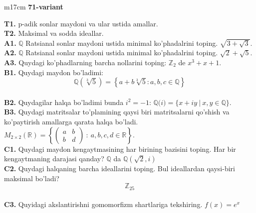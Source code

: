 \documentclass{article}
\begin{document}
\begin{tabular}{m{17cm}}
\textbf{71-variant}
\newline

\textbf{T1.} p-adik sonlar maydoni va ular ustida amallar. \\
\textbf{T2.} Maksimal va sodda ideallar. \\
\textbf{A1.} \(\mathbb{Q}\) Ratsianal sonlar maydoni ustida minimal ko'phadalrini toping.
\(\sqrt{3 + \sqrt{3}}\). \\
\textbf{A2.} \(\mathbb{Q}\) Ratsianal sonlar maydoni ustida minimal ko'phadalrini toping.
\(\sqrt{2} + \sqrt{5}\). \\
\textbf{A3.} Quydagi ko'phadlarning barcha nollarini toping:
\(\mathbb{Z}_{2}\) de \(x^{3} + x + 1\). \\
\textbf{B1.} Quydagi maydon bo'ladimi:
\[\mathbb{Q}\left( \sqrt[3]{5} \right) = \left\{ a + b\sqrt[3]{5}:a,b,c \in \mathbb{Q} \right\}\] \\
\textbf{B2.} Quydagilar halqa bo'ladimi bunda \(i^{2} = - 1\):
\(\mathbb{Q(}i) = \{ x + iy\ |\ x,y \in \mathbb{Q\}}\). \\
\textbf{B3.} Quydagi matritsalar to'plamining qaysi biri matritsalarni qo'shish va ko'paytirish amallarga qarata halqa bo'ladi.
\(M_{2 \times 2}\mathbb{(R) =}\left\{ \begin{pmatrix}
a & b \\
b & d
\end{pmatrix}\ :\ a,b,c,d \in \mathbb{R} \right\}\). \\
\textbf{C1.} Quydagi maydon kengaytmasining har birining bazisini toping. Har bir kengaytmaning darajasi qanday?
\(\mathbb{Q}\) da \(\mathbb{Q}\left( \sqrt{2},i \right)\) \\
\textbf{C2.} Quydagi halqaning barcha ideallarini toping. Bul ideallardan qaysi-biri maksimal bo'ladi?
\[\mathbb{Z}_{25}\] \\
\textbf{C3.} Quyidagi akslantirishni gomomorfizm shartlariga tekshiring. \(f(x) = e^{x}\) \\

\end{tabular}
\vspace{1cm}
\end{document}
